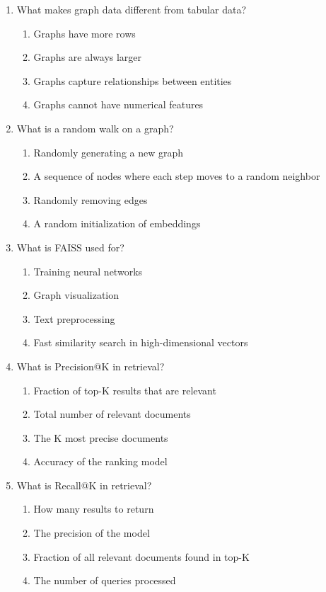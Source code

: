 \documentclass[12pt,a4paper]{article}
\begin{document}
\begin{enumerate}
\item What makes graph data different from tabular data?
\begin{enumerate}[label=\Alph*)]
    \item Graphs have more rows
    \item Graphs are always larger
    \item Graphs capture relationships between entities
    \item Graphs cannot have numerical features
\end{enumerate}

\item What is a random walk on a graph?
\begin{enumerate}[label=\Alph*)]
    \item Randomly generating a new graph
    \item A sequence of nodes where each step moves to a random neighbor
    \item Randomly removing edges
    \item A random initialization of embeddings
\end{enumerate}

\item What is FAISS used for?
\begin{enumerate}[label=\Alph*)]
    \item Training neural networks
    \item Graph visualization
    \item Text preprocessing
    \item Fast similarity search in high-dimensional vectors
\end{enumerate}

\item What is Precision@K in retrieval?
\begin{enumerate}[label=\Alph*)]
    \item Fraction of top-K results that are relevant
    \item Total number of relevant documents
    \item The K most precise documents
    \item Accuracy of the ranking model
\end{enumerate}

\item What is Recall@K in retrieval?
\begin{enumerate}[label=\Alph*)]
    \item How many results to return
    \item The precision of the model
    \item Fraction of all relevant documents found in top-K
    \item The number of queries processed
\end{enumerate}


\end{enumerate}
\end{document}
